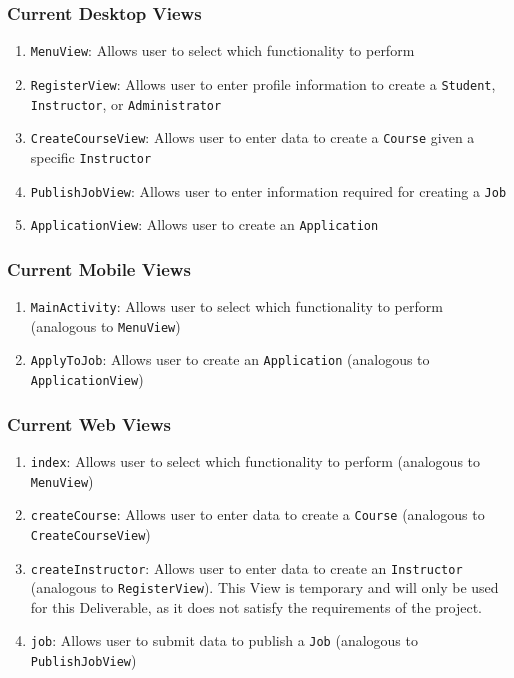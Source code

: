 \documentclass[12pt]{report}
\begin{document}
\subsubsection{Current Desktop Views}
\begin{enumerate}
	\item \texttt{MenuView}: Allows user to select which functionality to perform
	\item \texttt{RegisterView}: Allows user to enter profile information to create a
		\texttt{Student}, \texttt{Instructor}, or \texttt{Administrator}
	\item \texttt{CreateCourseView}: Allows user to enter data to create a \texttt{Course} given a specific
		\texttt{Instructor}
	\item \texttt{PublishJobView}: Allows user to enter information required for creating a
		\texttt{Job}
	\item \texttt{ApplicationView}: Allows user to create an \texttt{Application}
\end{enumerate}
\subsubsection{Current Mobile Views}
\begin{enumerate}
	\item \texttt{MainActivity}: Allows user to select which functionality to perform (analogous to
		\texttt{MenuView})
	\item \texttt{ApplyToJob}: Allows user to create an \texttt{Application} (analogous to
		\texttt{ApplicationView})
\end{enumerate}
\subsubsection{Current Web Views}
\begin{enumerate}
	\item \texttt{index}: Allows user to select which functionality to perform (analogous to
		\texttt{MenuView})
	\item \texttt{createCourse}: Allows user to enter data to create a \texttt{Course} (analogous to
		\texttt{CreateCourseView})
	\item \texttt{createInstructor}: Allows user to enter data to create an \texttt{Instructor}
		(analogous to \texttt{RegisterView}). This View is temporary and will only be used for this
		Deliverable, as it does not satisfy the requirements of the project.
	\item \texttt{job}: Allows user to submit data to publish a \texttt{Job} (analogous to
		\texttt{PublishJobView})
\end{enumerate}
\end{document}
